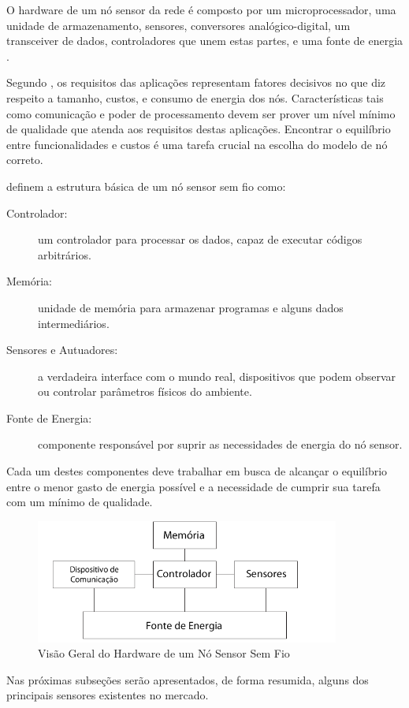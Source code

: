 O hardware de um nó sensor da rede é composto por um microprocessador, uma unidade de armazenamento, sensores, conversores analógico-digital, um transceiver de dados, controladores que unem estas partes, e uma fonte de energia \cite{Culler2004}.

Segundo \cite{Holger2005}, os requisitos das aplicações representam fatores decisivos no que diz respeito a tamanho, custos, e consumo de energia dos nós. Características tais como comunicação e poder de processamento devem ser prover um nível mínimo de qualidade que atenda aos requisitos destas aplicações. Encontrar o equilíbrio entre funcionalidades e custos é uma tarefa crucial na escolha do modelo de nó correto.

\cite{Holger2005} definem a estrutura básica de um nó sensor sem fio como:
\begin{description}
\item[Controlador:] um controlador para processar os dados, capaz de executar códigos arbitrários.
\item[Memória:] unidade de memória para armazenar programas e alguns dados intermediários.
\item[Sensores e Autuadores:] a verdadeira interface com o mundo real, dispositivos que podem observar ou controlar parâmetros físicos do ambiente.
\item[Fonte de Energia:] componente responsável por suprir as necessidades de energia do nó sensor.
\end{description}

Cada um destes componentes deve trabalhar em busca de alcançar o equilíbrio entre o menor gasto de energia possível e a necessidade de cumprir sua tarefa com um mínimo de qualidade.

\begin{figure}[h!]
\centering
\includegraphics[width=10cm]{pictures/overview_node.png}
\caption{Visão Geral do Hardware de um Nó Sensor Sem Fio}
 \label{fig:overview}
\end{figure}

Nas próximas subseções serão apresentados, de forma resumida, alguns dos principais sensores existentes no mercado.


